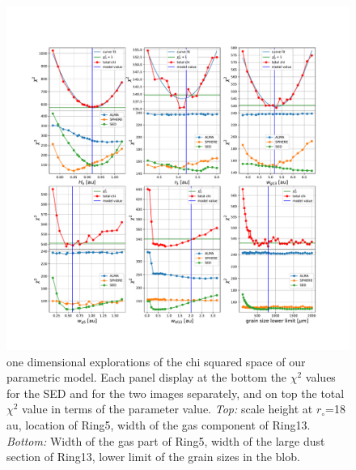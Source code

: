 \documentclass[fleqn,usenatbib,useAMS]{mnras}
\begin{document}
\begin{figure}
	\includegraphics[width=\textwidth]{plot_chi_squared_all800.pdf}
        \caption{one dimensional explorations of the chi squared space of our parametric model. Each panel display at the bottom the $\chi^2$ values for the SED and for the two images separately, and on top the total $\chi^2$ value in terms of the parameter value. {\it Top:} scale height at $r_\circ$=18\,au, location of Ring5, width of the gas component of Ring13. {\it Bottom:} Width of the gas part of Ring5, width of the large dust section of Ring13, lower limit of the grain sizes in the blob.}
    \label{fig:chi}
\end{figure}




\bsp	%
\label{lastpage}
\end{document}
